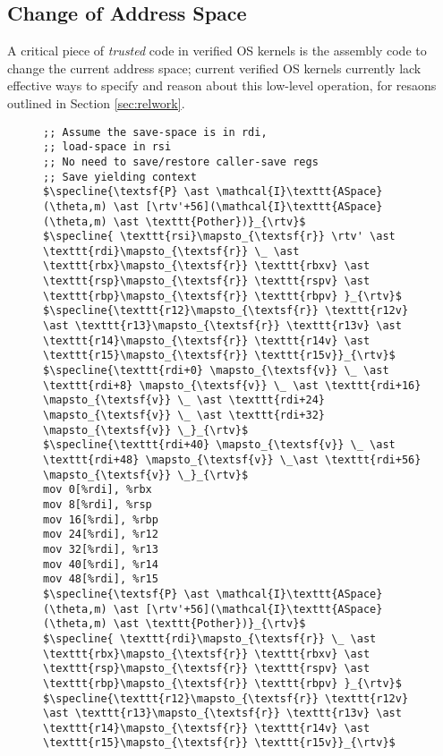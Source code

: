 \subsection{Change of Address Space}
A critical piece of \emph{trusted} code in verified OS kernels is the assembly code to change the current address space; current verified OS kernels currently lack effective ways to specify and reason about this low-level operation, for resaons outlined in Section \ref{sec:relwork}.
\begin{figure}\footnotesize
\begin{lstlisting}
;; Assume the save-space is in rdi,
;; load-space in rsi
;; No need to save/restore caller-save regs
;; Save yielding context
$\specline{\textsf{P} \ast \mathcal{I}\texttt{ASpace}(\theta,m) \ast [\rtv'+56](\mathcal{I}\texttt{ASpace}(\theta,m) \ast \texttt{Pother})}_{\rtv}$
$\specline{ \texttt{rsi}\mapsto_{\textsf{r}} \rtv' \ast \texttt{rdi}\mapsto_{\textsf{r}} \_ \ast \texttt{rbx}\mapsto_{\textsf{r}} \texttt{rbxv} \ast  \texttt{rsp}\mapsto_{\textsf{r}} \texttt{rspv} \ast \texttt{rbp}\mapsto_{\textsf{r}} \texttt{rbpv} }_{\rtv}$
$\specline{\texttt{r12}\mapsto_{\textsf{r}} \texttt{r12v} \ast \texttt{r13}\mapsto_{\textsf{r}} \texttt{r13v} \ast \texttt{r14}\mapsto_{\textsf{r}} \texttt{r14v} \ast \texttt{r15}\mapsto_{\textsf{r}} \texttt{r15v}}_{\rtv}$
$\specline{\texttt{rdi+0} \mapsto_{\textsf{v}} \_ \ast \texttt{rdi+8} \mapsto_{\textsf{v}} \_ \ast \texttt{rdi+16} \mapsto_{\textsf{v}} \_ \ast \texttt{rdi+24} \mapsto_{\textsf{v}} \_ \ast \texttt{rdi+32} \mapsto_{\textsf{v}} \_}_{\rtv}$
$\specline{\texttt{rdi+40} \mapsto_{\textsf{v}} \_ \ast \texttt{rdi+48} \mapsto_{\textsf{v}} \_\ast \texttt{rdi+56} \mapsto_{\textsf{v}} \_}_{\rtv}$
mov 0[%rdi], %rbx
mov 8[%rdi], %rsp
mov 16[%rdi], %rbp
mov 24[%rdi], %r12
mov 32[%rdi], %r13
mov 40[%rdi], %r14
mov 48[%rdi], %r15
$\specline{\textsf{P} \ast \mathcal{I}\texttt{ASpace}(\theta,m) \ast [\rtv'+56](\mathcal{I}\texttt{ASpace}(\theta,m) \ast \texttt{Pother})}_{\rtv}$
$\specline{ \texttt{rdi}\mapsto_{\textsf{r}} \_ \ast \texttt{rbx}\mapsto_{\textsf{r}} \texttt{rbxv} \ast  \texttt{rsp}\mapsto_{\textsf{r}} \texttt{rspv} \ast \texttt{rbp}\mapsto_{\textsf{r}} \texttt{rbpv} }_{\rtv}$
$\specline{\texttt{r12}\mapsto_{\textsf{r}} \texttt{r12v} \ast \texttt{r13}\mapsto_{\textsf{r}} \texttt{r13v} \ast \texttt{r14}\mapsto_{\textsf{r}} \texttt{r14v} \ast \texttt{r15}\mapsto_{\textsf{r}} \texttt{r15v}}_{\rtv}$

\end{lstlisting}
\end{figure}

